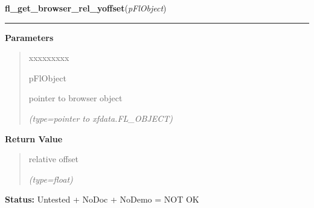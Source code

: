 \hspace{.8\funcindent}\begin{boxedminipage}{\funcwidth}

    \raggedright \textbf{fl\_get\_browser\_rel\_yoffset}(\textit{pFlObject})

    \vspace{-1.5ex}

    \rule{\textwidth}{0.5\fboxrule}
\setlength{\parskip}{2ex}
\setlength{\parskip}{1ex}
      \textbf{Parameters}
      \vspace{-1ex}

      \begin{quote}
        \begin{Ventry}{xxxxxxxxx}

          \item[pFlObject]

          pointer to browser object

            {\it (type=pointer to xfdata.FL\_OBJECT)}

        \end{Ventry}

      \end{quote}

      \textbf{Return Value}
    \vspace{-1ex}

      \begin{quote}
      relative offset

      {\it (type=float)}

      \end{quote}

\textbf{Status:} Untested + NoDoc + NoDemo = NOT OK



    \end{boxedminipage}

    \label{xformslib:flbrowser:fl_set_browser_yoffset}

    \vspace{0.5ex}

